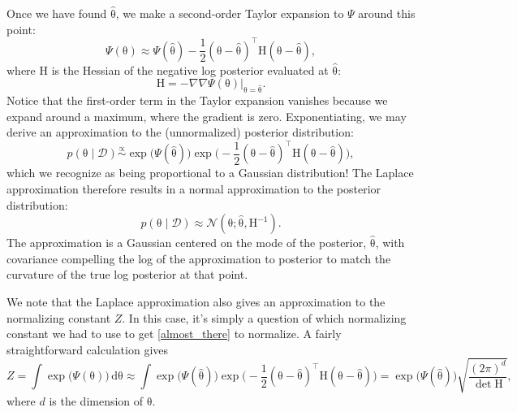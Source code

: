 \documentclass{article}
\newcommand{\given}{\mid}
\newcommand{\mc}[1]{\mathcal{#1}}
\newcommand{\data}{\mc{D}}
\newcommand{\intd}[1]{\,\mathrm{d}{#1}}
\newcommand{\inv}{^{-1}}
\newcommand{\trans}{^\top}
\newcommand{\mat}[1]{\bm{\mathrm{#1}}}
\renewcommand{\vec}[1]{\bm{\mathrm{#1}}}
\begin{document}
Once we have found $\hat{\vec{\theta}}$, we make a second-order Taylor
expansion to $\Psi$ around this point:
\begin{equation*}
  \Psi(\vec{\theta})
  \approx
  \Psi(\hat{\vec{\theta}})
  -
  \frac{1}{2}
  (\vec{\theta} - \hat{\vec{\theta}})\trans
  \mat{H}
  (\vec{\theta} - \hat{\vec{\theta}}),
\end{equation*}
where $\mat{H}$ is the Hessian of the negative log posterior evaluated
at $\hat{\vec{\theta}}$:
\begin{equation*}
  \mat{H}
  =
  -\nabla\nabla \Psi(\vec{\theta}) \bigr\rvert_{\vec{\theta} = \hat{\vec{\theta}}}.
\end{equation*}
Notice that the first-order term in the Taylor expansion vanishes
because we expand around a maximum, where the gradient is zero.
Exponentiating, we may derive an approximation to the (unnormalized)
posterior distribution:
\begin{equation}
  \label{almost_there}
  p(\vec{\theta} \given \data)
  \overset{\propto}{\sim}
  \exp\bigl(\Psi(\hat{\vec{\theta}})\bigr)
  \exp\biggl(-\frac{1}{2}
  (\vec{\theta} - \hat{\vec{\theta}})\trans
  \mat{H}
  (\vec{\theta} - \hat{\vec{\theta}})
  \biggr),
\end{equation}
which we recognize as being proportional to a Gaussian distribution!
The Laplace approximation therefore results in a normal approximation
to the posterior distribution:
\begin{equation*}
  p(\vec{\theta} \given \data)
  \approx
  \mc{N}(\vec{\theta}; \hat{\vec{\theta}}, \mat{H}\inv).
\end{equation*}
The approximation is a Gaussian centered on the mode of the posterior,
$\hat{\vec{\theta}}$, with covariance compelling the log of the
approximation to posterior to match the curvature of the true log
posterior at that point.

We note that the Laplace approximation also gives an approximation to
the normalizing constant $Z$.  In this case, it's simply a question of
which normalizing constant we had to use to get \eqref{almost_there}
to normalize.  A fairly straightforward calculation gives
\begin{equation*}
  Z
  =
  \int \exp\bigl(\Psi(\vec{\theta})\bigr) \intd{\vec{\theta}}
  \approx
  \int
  \exp\bigl(\Psi(\hat{\vec{\theta}})\bigr)
  \exp\biggl(-\frac{1}{2}
  (\vec{\theta} - \hat{\vec{\theta}})\trans
  \mat{H}
  (\vec{\theta} - \hat{\vec{\theta}})
  \biggr)
  =
  \exp\bigl(\Psi(\hat{\vec{\theta}})\bigr)
  \sqrt{
    \frac{(2\pi)^d}
         {\det \mat{H}}
   },
\end{equation*}
where $d$ is the dimension of $\vec{\theta}$.
\end{document}
